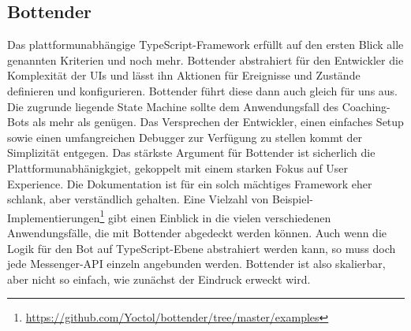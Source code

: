     \subsection{Bottender}
        Das plattformunabhängige TypeScript-Framework erfüllt auf den ersten Blick alle genannten Kriterien und noch mehr. 
        Bottender abstrahiert für den Entwickler die Komplexität der UIs und lässt ihn Aktionen für Ereignisse und Zustände definieren und konfigurieren. Bottender führt diese dann auch gleich für uns aus. Die zugrunde liegende State Machine sollte dem Anwendungsfall des Coaching-Bots als mehr als genügen. Das Versprechen der Entwickler, einen einfaches Setup sowie einen umfangreichen Debugger zur Verfügung zu stellen kommt der Simplizität entgegen. Das stärkste Argument für Bottender ist sicherlich die Plattformunabhänigkgiet, gekoppelt mit einem starken Fokus auf User Experience. Die Dokumentation ist für ein solch mächtiges Framework eher schlank, aber verständlich gehalten. Eine Vielzahl von Beispiel-Implementierungen\footnote{\url{https://github.com/Yoctol/bottender/tree/master/examples}} gibt einen Einblick in die vielen verschiedenen Anwendungsfälle, die mit Bottender abgedeckt werden können. Auch wenn die Logik für den Bot auf TypeScript-Ebene abstrahiert werden kann, so muss doch jede Messenger-API einzeln angebunden werden. Bottender ist also skalierbar, aber nicht so einfach, wie zunächst der Eindruck erweckt wird.


